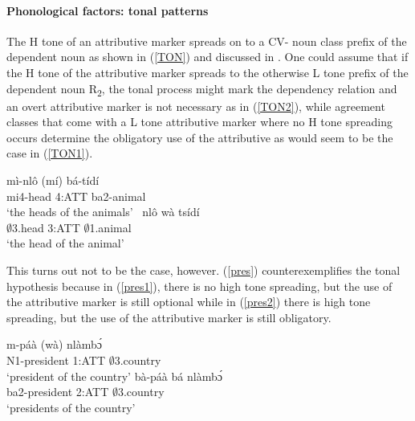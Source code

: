 \paragraph{Phonological factors: tonal patterns}

The H tone of an attributive marker spreads on to a CV- noun class prefix of the dependent noun as shown in (\ref{TON}) and discussed in . One could assume that if the H tone of the attributive marker spreads to the otherwise L tone prefix of the dependent noun R\textsubscript{2}, the tonal process might mark the dependency relation and an overt attributive marker is not necessary as in (\ref{TON2}), while agreement classes that come with a L tone attributive marker where no H tone spreading occurs determine the obligatory use of the attributive as would seem to be the case in (\ref{TON1}).

\begin{exe}
\ex\label{TON}
\begin{xlist}
\ex\label{TON2}
 \gll     mì-nlô (mí) bá-tídí \\
               mi4-head 4:ATT ba2-animal \\
    \trans `the heads of the animals'
\ex \label{TON1}
  \gll     \ nlô wà tsídí \\
               $\emptyset$3.head 3:ATT $\emptyset$1.animal  \\
    \trans `the head of the animal'
\end {xlist}
\end{exe}

This turns out not to be the case, however. (\ref{pres}) counterexemplifies the tonal hypothesis because in (\ref{pres1}), there is no high tone spreading, but the use of the attributive marker is still optional while in (\ref{pres2}) there is high tone spreading, but the use of the attributive marker is still obligatory.

\begin{exe}
\ex\label{pres}
\begin{xlist}
\ex \label{pres1}
  \gll     m-páà (wà) nlàmbɔ́ \\
               N1-president 1:ATT $\emptyset$3.country  \\
    \trans `president of the country'
\ex\label{pres2}
 \gll     bà-páà bá nlàmbɔ́ \\
               ba2-president 2:ATT $\emptyset$3.country \\
    \trans `presidents of the country'
\end {xlist}
\end{exe}


